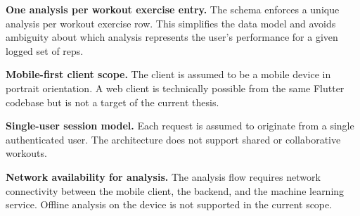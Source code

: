 \textbf{One analysis per workout exercise entry.} The schema enforces a unique analysis per workout exercise row. This simplifies the data model and avoids ambiguity about which analysis represents the user's performance for a given logged set of reps.

\textbf{Mobile-first client scope.} The client is assumed to be a mobile device in portrait orientation. A web client is technically possible from the same Flutter codebase but is not a target of the current thesis.

\textbf{Single-user session model.} Each request is assumed to originate from a single authenticated user. The architecture does not support shared or collaborative workouts.

\textbf{Network availability for analysis.} The analysis flow requires network connectivity between the mobile client, the backend, and the machine learning service. Offline analysis on the device is not supported in the current scope.
